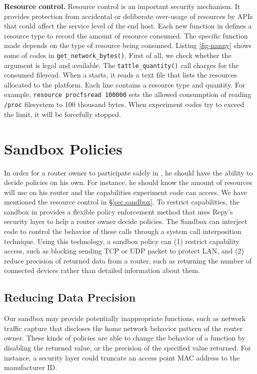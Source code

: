 

\textbf{Resource control.} Resource control is an important security mechanism. It provides protection from accidental or deliberate over-usage of resources by APIs that could affect the service level of the end host. Each new function in \sandboxname defines a resource type to record the amount of resource consumed. The specific function made depends on the type of resource being consumed. Listing \ref{fig-nanny} shows some of codes in \texttt{get\_network\_bytes()}. First of all, we check whether the argument is legal and available. The \texttt{tattle\_quantity()} call charges for the consumed fileread. When a \sysname starts, it reads a text file that lists the resources allocated to the platform. Each line contains a resource type and quantity. For example, \texttt{resource procfsread 100000} sets the allowed consumption of reading \texttt{/proc} filesystem to 100 thousand bytes. When experiment codes try to exceed the limit, it will be forcefully stopped.

\section{Sandbox Policies}
\label{sec.policy}
In order for a router owner to participate safely in \sysname, he should have the ability to decide policies on his own. For instance, he should know the amount of resources \sysname will use on his router and the capabilities experiment code can access. We have mentioned the resource control in \S{\ref{sec.sandbox}}. To restrict capabilities, the sandbox in \sysname provides a flexible policy enforcement method that uses Repy's security layer to help a router owner decide policies. The Sandbox can interject code to control the behavior of these calls through a system call interposition technique. Using this technology, a sandbox policy can (1) restrict capability access, such as blocking sending TCP or UDP packet to protect LAN, and (2) reduce precision of returned data from a router, such as returning the number of connected devices rather than detailed information about them.

\subsection{Reducing Data Precision}
Our sandbox may provide potentially inappropriate functions, such as network traffic capture that discloses the home network behavior pattern of the router owner. These kinds of policies are able to change the behavior of a function by disabling the returned value, or the precision of the specified value returned. For instance, a security layer could truncate an access point MAC address to the manufacturer ID.

